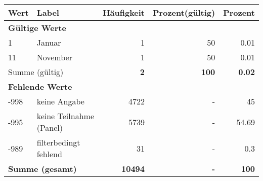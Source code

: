      \begin{longtable}{lXrrr}
     \toprule
     \textbf{Wert} & \textbf{Label} & \textbf{Häufigkeit} & \textbf{Prozent(gültig)} & \textbf{Prozent} \\
     \endhead
     \midrule
     \multicolumn{5}{l}{\textbf{Gültige Werte}}\\

     1 &
     \multicolumn{1}{X}{ Januar   } &


       \num{1} &
       \num[round-mode=places,round-precision=2]{50} &
         \num[round-mode=places,round-precision=2]{0.01} \\

     11 &
     \multicolumn{1}{X}{ November   } &


       \num{1} &
       \num[round-mode=places,round-precision=2]{50} &
         \num[round-mode=places,round-precision=2]{0.01} \\
     \midrule
     \multicolumn{2}{l}{Summe (gültig)} &
       \textbf{\num{2}} &
     \textbf{\num{100}} &
       \textbf{\num[round-mode=places,round-precision=2]{0.02}} \\
     \multicolumn{5}{l}{\textbf{Fehlende Werte}}\\
       -998 &
       keine Angabe &
         \num{4722} &
        - &
         \num[round-mode=places,round-precision=2]{45} \\
       -995 &
       keine Teilnahme (Panel) &
         \num{5739} &
        - &
         \num[round-mode=places,round-precision=2]{54.69} \\
       -989 &
       filterbedingt fehlend &
         \num{31} &
        - &
         \num[round-mode=places,round-precision=2]{0.3} \\
     \midrule
     \multicolumn{2}{l}{\textbf{Summe (gesamt)}} &
          \textbf{\num{10494}} &
        \textbf{-} &
        \textbf{\num{100}} \\
     \bottomrule
     \end{longtable}
     
